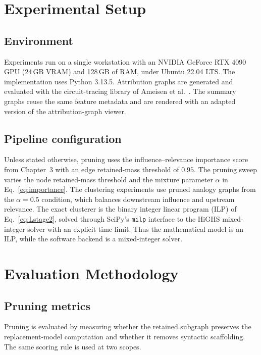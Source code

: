 \documentclass[../main.tex]{subfiles}
\begin{document}
\section{Experimental Setup}
\label{sec:setup}

\subsection{Environment}
Experiments run on a single workstation with an NVIDIA GeForce RTX 4090 GPU
(24\,GB VRAM) and 128\,GB of RAM, under Ubuntu 22.04 LTS. The implementation uses
Python 3.13.5. Attribution graphs are generated and evaluated with the
circuit-tracing library of Ameisen et al.~\cite{ameisen2025circuit}. The summary
graphs reuse the same feature metadata and are rendered with an adapted version
of the attribution-graph viewer.

\subsection{Pipeline configuration}
Unless stated otherwise, pruning uses the influence--relevance importance score
from Chapter~3 with an edge retained-mass threshold of $0.95$. The pruning sweep
varies the node retained-mass threshold and the mixture parameter $\alpha$ in
Eq.~\eqref{eq:importance}. The clustering experiments use pruned analogy graphs
from the $\alpha=0.5$ condition, which balances downstream influence and upstream
relevance. The exact clusterer is the binary integer linear program (ILP) of
Eq.~\eqref{eq:Lstage2}, solved through SciPy's \texttt{milp} interface to the
HiGHS mixed-integer solver with an explicit time limit. Thus the mathematical
model is an ILP, while the software backend is a mixed-integer solver.

\section{Evaluation Methodology}
\label{sec:eval-method}

\subsection{Pruning metrics}
Pruning is evaluated by measuring whether the retained subgraph preserves the
replacement-model computation and whether it removes syntactic scaffolding. The
same scoring rule is used at two scopes.
\end{document}
